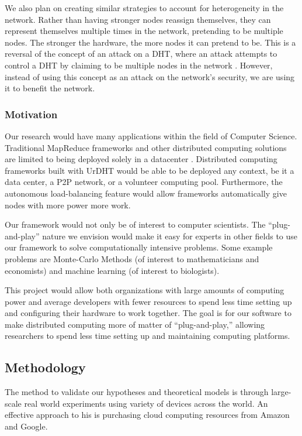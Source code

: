 \documentclass[12pt,a4paper]{article}
\begin{document}
We also plan on creating similar strategies to account for heterogeneity in the network.
Rather than having stronger nodes reassign themselves, they can represent themselves multiple times in the network, pretending to be multiple nodes.
The stronger the hardware, the more nodes it can pretend to be.
This is a reversal of the concept of an attack on a DHT, where an attack attempts to control a DHT by claiming to be multiple nodes in the network \cite{sybil}.
However, instead of using this concept as an attack on the network's security, we are using it to benefit the network.



\subsubsection*{Motivation}
Our research would have many applications within the field of Computer Science.
Traditional MapReduce frameworks and other distributed computing solutions are limited to being deployed solely in a datacenter \cite{hadoopAssumptions}.
Distributed computing frameworks built with UrDHT would be able to be deployed any context, be it a data center, a P2P network, or a volunteer computing pool.
Furthermore, the autonomous load-balancing feature would allow frameworks automatically give nodes with more power more work.

Our framework would not only be of interest to computer scientists.
The ``plug-and-play'' nature we envision would make it easy for experts in other fields to use our framework to solve computationally intensive problems.
Some example problems are Monte-Carlo Methods (of interest to mathematicians and economists) and machine learning (of interest to biologists).

This project would allow both organizations with large amounts of computing power and average developers with  fewer resources to spend less time setting up and configuring their hardware to work together.  
The goal is for our software to make distributed computing more of matter of ``plug-and-play,'' allowing researchers to spend less time setting up and maintaining  computing platforms.

\subsection*{Methodology}

The method to validate our hypotheses and theoretical models is through large-scale real world experiments using variety of devices across the world.
An effective approach to his is purchasing cloud computing resources from Amazon and Google.
\end{document}

